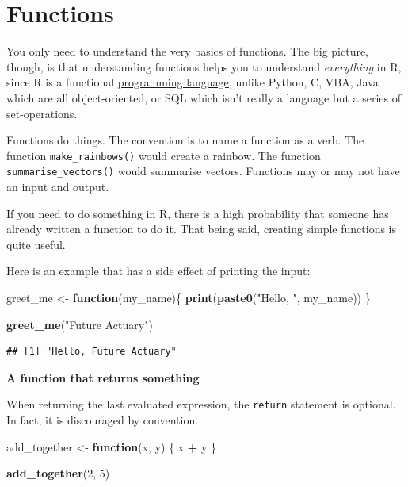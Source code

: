 \documentclass[openany]{book}
\newenvironment{Shaded}{\begin{snugshade}}{\end{snugshade}}
\newcommand{\ControlFlowTok}[1]{\textcolor[rgb]{0.13,0.29,0.53}{\textbf{#1}}}
\newcommand{\DecValTok}[1]{\textcolor[rgb]{0.00,0.00,0.81}{#1}}
\newcommand{\KeywordTok}[1]{\textcolor[rgb]{0.13,0.29,0.53}{\textbf{#1}}}
\newcommand{\NormalTok}[1]{#1}
\newcommand{\OperatorTok}[1]{\textcolor[rgb]{0.81,0.36,0.00}{\textbf{#1}}}
\newcommand{\StringTok}[1]{\textcolor[rgb]{0.31,0.60,0.02}{#1}}
\begin{document}
\hypertarget{functions}{%
\section{Functions}\label{functions}}

You only need to understand the very basics of functions. The big picture, though, is that
understanding functions helps you to understand \emph{everything} in R, since R is a
functional \href{http://adv-r.had.co.nz/Functional-programming.html}{programming language},
unlike Python, C, VBA, Java which are all object-oriented, or SQL which isn't
really a language but a series of set-operations.

Functions do things. The convention is to name a function as a verb. The function
\texttt{make\_rainbows()} would create a rainbow. The function \texttt{summarise\_vectors()}
would summarise vectors. Functions may or may not have an input and output.

If you need to do something in R, there is a high probability that someone has
already written a function to do it. That being said, creating simple functions
is quite useful.

Here is an example that has a side effect of printing the input:

\begin{Shaded}
\begin{Highlighting}[]
\NormalTok{greet_me <-}\StringTok{ }\ControlFlowTok{function}\NormalTok{(my_name)\{}
  \KeywordTok{print}\NormalTok{(}\KeywordTok{paste0}\NormalTok{(}\StringTok{"Hello, "}\NormalTok{, my_name))}
\NormalTok{\}}

\KeywordTok{greet_me}\NormalTok{(}\StringTok{"Future Actuary"}\NormalTok{)}
\end{Highlighting}
\end{Shaded}

\begin{verbatim}
## [1] "Hello, Future Actuary"
\end{verbatim}

\textbf{A function that returns something}

When returning the last evaluated expression, the \texttt{return} statement is optional.
In fact, it is discouraged by convention.

\begin{Shaded}
\begin{Highlighting}[]
\NormalTok{add_together <-}\StringTok{ }\ControlFlowTok{function}\NormalTok{(x, y) \{}
\NormalTok{  x }\OperatorTok{+}\StringTok{ }\NormalTok{y}
\NormalTok{\}}

\KeywordTok{add_together}\NormalTok{(}\DecValTok{2}\NormalTok{, }\DecValTok{5}\NormalTok{)}
\end{Highlighting}
\end{Shaded}
\end{document}
